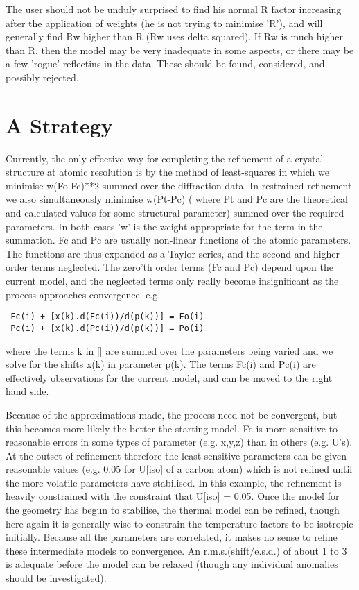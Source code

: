 \documentclass[10pt,a4paper]{report}
\begin{document}
The user should not be unduly surprised to find his normal R factor
 increasing after the application of weights (he is not trying to minimise
 'R'), and will generally find Rw higher than R (Rw uses delta squared).
 If Rw is much higher than R, then the model may be very inadequate in 
 some aspects, or there may be a few 'rogue' reflectins in the data. These
 should be found, considered, and possibly rejected.



\section{A Strategy}


Currently, the only effective way for completing the refinement of a
 crystal structure at atomic resolution is by the method of least-squares
 in which we minimise w(Fo-Fc)**2 summed over the diffraction data. In
 restrained refinement we also simultaneously minimise w(Pt-Pc) ( where
 Pt and Pc are the theoretical and calculated values for some structural
 parameter) summed over the required parameters. 
 In both cases 'w' is the weight appropriate for the term in the summation.
 Fc and Pc are usually
 non-linear functions of the atomic parameters. The functions are thus expanded
 as a Taylor series, and the second and higher order terms neglected. The
 zero'th order terms (Fc and Pc) depend upon the current model, and the
 neglected terms only really become insignificant as the process approaches
 convergence. e.g.

\small\begin{verbatim}
 Fc(i) + [x(k).d(Fc(i))/d(p(k))] = Fo(i) 
 Pc(i) + [x(k).d(Pc(i))/d(p(k))] = Po(i) 
\end{verbatim}\normalsize




where the terms k in [] are summed over the parameters being varied and we
 solve for the shifts x(k) in parameter p(k). The terms Fc(i) and Pc(i) are 
 effectively observations for the current model, and can be moved to the 
 right hand side.


Because of the approximations made, the process need not be
 convergent, but this becomes more likely the better the starting model.
 Fc is more sensitive to reasonable errors in some types of parameter
 (e.g. x,y,z) than in others (e.g. U's). At the outset of refinement therefore
 the least sensitive parameters can be given reasonable values (e.g. 0.05
 for U[iso] of a carbon atom) which is not refined until the more volatile
 parameters have stabilised. In this example, the
 refinement is heavily constrained with
 the constraint that U[iso] = 0.05. Once the model for the geometry has begun
 to stabilise, the thermal model can be refined, though here again it is
 generally wise to constrain the temperature factors to be isotropic initially.
 Because all the parameters are correlated, it makes no sense to refine these
 intermediate models to convergence. An r.m.s.(shift/e.s.d.) of about 1 to 3
 is adequate before the model can be relaxed (though any individual
 anomalies should be investigated).
\end{document}
